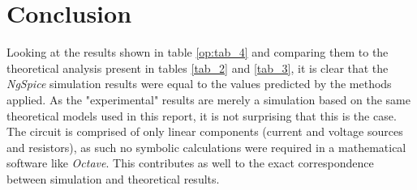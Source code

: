 \section{Conclusion}
\label{sec:conclusion}

Looking at the results shown in table \ref{op:tab_4} and comparing them to the theoretical analysis present in tables \ref{tab_2} and \ref{tab_3}, it is clear that the \emph{NgSpice} simulation results were equal to the values predicted by the methods applied. As the "experimental" results are merely a simulation based on the same theoretical models used in this report, it is not surprising that this is the case. The circuit is comprised of only linear components (current and voltage sources and resistors), as such no symbolic calculations were required in a mathematical software like \emph{Octave}. This contributes as well to the exact correspondence between simulation and theoretical results.
